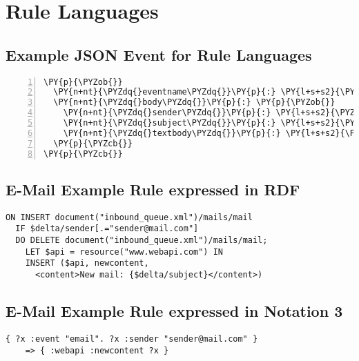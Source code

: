 
\chapter{Rule Languages}

\section{Example JSON Event for Rule Languages}
\begin{Verbatim}[frame=single,fontsize=\footnotesize,commandchars=\\\{\},numbers=left,firstnumber=1,stepnumber=1,xleftmargin
=.3in]
\PY{p}{\PYZob{}}
  \PY{n+nt}{\PYZdq{}eventname\PYZdq{}}\PY{p}{:} \PY{l+s+s2}{\PYZdq{}email\PYZdq{}}\PY{p}{,}
  \PY{n+nt}{\PYZdq{}body\PYZdq{}}\PY{p}{:} \PY{p}{\PYZob{}}
    \PY{n+nt}{\PYZdq{}sender\PYZdq{}}\PY{p}{:} \PY{l+s+s2}{\PYZdq{}sender@mail.com\PYZdq{}}\PY{p}{,}
    \PY{n+nt}{\PYZdq{}subject\PYZdq{}}\PY{p}{:} \PY{l+s+s2}{\PYZdq{}Important subject!\PYZdq{}}\PY{p}{,}
    \PY{n+nt}{\PYZdq{}textbody\PYZdq{}}\PY{p}{:} \PY{l+s+s2}{\PYZdq{}Hi User,\PYZbs{}n\PYZbs{}nThis is a lengthy mail body\PYZdq{}}
  \PY{p}{\PYZcb{}}
\PY{p}{\PYZcb{}}
\end{Verbatim}


\section{E-Mail Example Rule expressed in RDF}
\begin{lstlisting}[nolol,float=h,label=lstrdf,language=RDF]
  ON INSERT document("inbound_queue.xml")/mails/mail
  IF $delta/sender[.="sender@mail.com"]
  DO DELETE document("inbound_queue.xml")/mails/mail;
    LET $api = resource("www.webapi.com") IN
    INSERT ($api, newcontent,
      <content>New mail: {$delta/subject}</content>)
\end{lstlisting}


\section{E-Mail Example Rule expressed in Notation 3}
\begin{lstlisting}[nolol,float=h,label=lstn3,language=N3]
  { ?x :event "email". ?x :sender "sender@mail.com" }
    => { :webapi :newcontent ?x }
\end{lstlisting}


